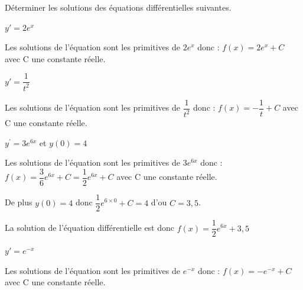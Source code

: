 \documentclass[11pt,a4paper]{article}  %
\begin{document}
	\graphicspath{{images/}}
	
	\begin{center}
		
		
		\fbox{
			\begin{minipage}[]{15cm}
				\begin{center}
					\LARGE{\rule{0.5cm}{0pt}\rule[-0.25cm]{0pt}{0.9cm}
						\textcolor{red}{Correction - Chapitre 04 - Equations différentielles\\
						Exercices obligatoires}
					}
				\end{center}
			\end{minipage}
		}
	\end{center}
	
\vspace*{-0.5cm}
\exerciceDS{}

Déterminer les solutions des équations différentielles suivantes.
	\begin{enumMet}
	\item $y'=2e^x$
	\begin{corrBox}
		Les solutions de l'équation sont les primitives de $2e^x$ donc : $f(x)=2e^x+C$ avec C une constante réelle.
	\end{corrBox}
	\item $y'=\dfrac{1}{t^2}$
	\begin{corrBox}
		Les solutions de l'équation sont les primitives de $\dfrac{1}{t^2}$ donc : $f(x)=-\dfrac{1}{t}+C$ avec C une constante réelle.
	\end{corrBox}
	\item $y^{\prime}=3 e^{6 x}$ et $y(0)=4$
	\begin{corrBox}
		Les solutions de l'équation sont les primitives de $3 e^{6 x}$ donc : $f(x)=\dfrac{3}{6}e^{6x}+C=\dfrac{1}{2}e^{6x}+C$ avec C une constante réelle.
		
		De plus $y(0)=4$ donc $\dfrac{1}{2}e^{6\times 0}+C=4$ d'ou $C=3,5$.
		
		La solution de l'équation différentielle est donc $f(x)=\dfrac{1}{2}e^{6x}+3,5$
	\end{corrBox}
	\item $y'=e^{-x}$
	\begin{corrBox}
		Les solutions de l'équation sont les primitives de $e^{-x}$ donc : $f(x)=-e^{-x}+C$ avec C une constante réelle.
	\end{corrBox}
\end{enumMet}
\end{document}
